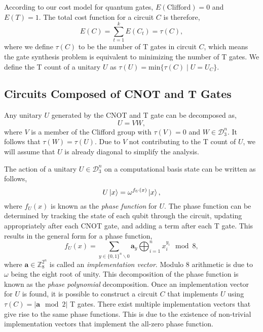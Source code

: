 \documentclass{article}
\theoremstyle{definition}
\theoremstyle{problem}
\theoremstyle{lemma}
\begin{document}
	According to our cost model for quantum gates, $E(\text{Clifford}) = 0$ and $E(T)=1$. The total cost function for a circuit $C$ is therefore,
	\begin{equation}
	E(C) = \sum_{t=1}^k E(C_t) = \tau(C),
	\end{equation}
	where we define $\tau(C)$ to be the number of T gates in circuit $C$, which means the gate synthesis problem is equivalent to minimizing the number of T gates. We define the T count of a unitary $U$ as $\tau(U) = \text{min}\{\tau(C) \mid U = U_C\}$.
	
	\label{s3_Problem}
		\subsection{Circuits Composed of CNOT and T Gates}
	Any unitary $U$ generated by the CNOT and T gate can be decomposed as,
	\begin{equation}
	U = VW,
	\end{equation}
	where $V$ is a member of the Clifford group with $\tau(V)=0$ and $W \in \mathcal{D}_3^n$. It follows that $\tau(W) = \tau(U)$. Due to $V$ not contributing to the T count of $U$, we will assume that $U$ is already diagonal to simplify the analysis.
	
	The action of a unitary $U \in \mathcal{D}_3^n$ on a computational basis state can be written as follows,
	\begin{equation}
	U\left\vert{x}\right\rangle = \omega^{f_U(x)}\left\vert{x}\right\rangle,
	\end{equation}
	where $f_U(x)$ is known as the \emph{phase function} for $U$. The phase function can be determined by tracking the state of each qubit through the circuit, updating appropriately after each CNOT gate, and adding a term after each T gate. This results in the general form for a phase function,
	\begin{equation}
	f_U(x) = \sum_{y\in\{0,1\}^n\backslash 0} \mathbf{a}_y \bigoplus_{i=1}^n x_i^{y_i}\mod 8,
	\end{equation}
	where $\mathbf{a}\in \mathbb{Z}_8^{2^n}$ is called an \emph{implementation vector}. Modulo 8 arithmetic is due to $\omega$ being the eight root of unity. This decomposition of the phase function is known as the \emph{phase polynomial} decomposition. Once an implementation vector for $U$ is found, it is possible to construct a circuit $C$ that implements $U$ using $\tau(C) = |\mathbf{a} \mod 2|$ T gates. There exist multiple implementation vectors that give rise to the same phase functions. This is due to the existence of non-trivial implementation vectors that implement the all-zero phase function.
	
\end{document}
